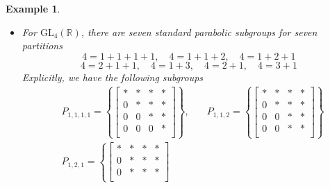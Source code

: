 \documentclass[12pt]{article} %
\newtheorem{example}[definition]{Example}
\begin{document}
\begin{example}
\begin{itemize}
        \item For  $\text{GL}_4(\mathbb{R})$, there are seven standard parabolic subgroups for seven partitions
              \[ 4 = 1+ 1+1+1, \quad 4 =1+1+2, \quad 4 = 1+2+1\]
              \[4 =2+1+1, \quad 4 = 1+3, \quad 4 = 2+1, \quad 4 = 3+1\]
              Explicitly, we have the following subgroups
              \begin{align*}
                   & P_{1,1,1,1} = \left\lbrace \begin{bmatrix}
                                                    \ast & \ast & \ast & \ast \\
                                                    0    & \ast & \ast & \ast \\
                                                    0    & 0    & \ast & \ast \\
                                                    0    & 0    & 0    & \ast \\
                                                \end{bmatrix} \right\rbrace, \quad & P_{1,1,2} = \left\lbrace \begin{bmatrix}
                                                                                                                  \ast & \ast & \ast & \ast \\
                                                                                                                  0    & \ast & \ast & \ast \\
                                                                                                                  0    & 0    & \ast & \ast \\
                                                                                                                  0    & 0    & \ast & \ast \\
                                                                                                              \end{bmatrix} \right\rbrace \\
                   & P_{1,2,1} = \left\lbrace \begin{bmatrix}
                                                  \ast & \ast & \ast & \ast \\
                                                  0    & \ast & \ast & \ast \\
                                                  0    & \ast & \ast & \ast \\

\end{bmatrix}
\end{align*}
\end{itemize}
\end{example}
\end{document}
